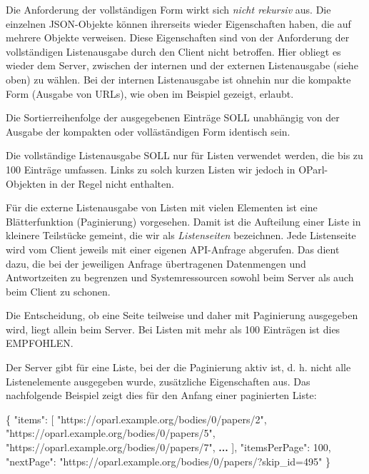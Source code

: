 \documentclass[,a4paper]{article}
\newenvironment{Shaded}{}{}
\newcommand{\DataTypeTok}[1]{\textcolor[rgb]{0.56,0.13,0.00}{{#1}}}
\newcommand{\DecValTok}[1]{\textcolor[rgb]{0.25,0.63,0.44}{{#1}}}
\newcommand{\StringTok}[1]{\textcolor[rgb]{0.25,0.44,0.63}{{#1}}}
\newcommand{\OtherTok}[1]{\textcolor[rgb]{0.00,0.44,0.13}{{#1}}}
\newcommand{\FunctionTok}[1]{\textcolor[rgb]{0.02,0.16,0.49}{{#1}}}
\newcommand{\ErrorTok}[1]{\textcolor[rgb]{1.00,0.00,0.00}{\textbf{{#1}}}}
\begin{document}
Die Anforderung der vollständigen Form wirkt sich \emph{nicht rekursiv}
aus. Die einzelnen JSON-Objekte können ihrerseits wieder Eigenschaften
haben, die auf mehrere Objekte verweisen. Diese Eigenschaften sind von
der Anforderung der vollständigen Listenausgabe durch den Client nicht
betroffen. Hier obliegt es wieder dem Server, zwischen der internen und
der externen Listenausgabe (siehe oben) zu wählen. Bei der internen
Listenausgabe ist ohnehin nur die kompakte Form (Ausgabe von URLs), wie
oben im Beispiel gezeigt, erlaubt.

Die Sortierreihenfolge der ausgegebenen Einträge SOLL unabhängig von der
Ausgabe der kompakten oder volläständigen Form identisch sein.

Die vollständige Listenausgabe SOLL nur für Listen verwendet werden, die
bis zu 100 Einträge umfassen. Links zu solch kurzen Listen wir jedoch in
OParl-Objekten in der Regel nicht enthalten.


Für die externe Listenausgabe von Listen mit vielen Elementen ist eine
Blätterfunktion (Paginierung) vorgesehen. Damit ist die Aufteilung einer
Liste in kleinere Teilstücke gemeint, die wir als \emph{Listenseiten}
bezeichnen. Jede Listenseite wird vom Client jeweils mit einer eigenen
API-Anfrage abgerufen. Das dient dazu, die bei der jeweiligen Anfrage
übertragenen Datenmengen und Antwortzeiten zu begrenzen und
Systemressourcen sowohl beim Server als auch beim Client zu schonen.

Die Entscheidung, ob eine Seite teilweise und daher mit Paginierung
ausgegeben wird, liegt allein beim Server. Bei Listen mit mehr als 100
Einträgen ist dies EMPFOHLEN.

Der Server gibt für eine Liste, bei der die Paginierung aktiv ist, d. h.
nicht alle Listenelemente ausgegeben wurde, zusätzliche Eigenschaften
aus. Das nachfolgende Beispiel zeigt dies für den Anfang einer
paginierten Liste:

\begin{Shaded}
\begin{Highlighting}[]
\FunctionTok{\{}
    \DataTypeTok{"items"}\FunctionTok{:} \OtherTok{[}
        \StringTok{"https://oparl.example.org/bodies/0/papers/2"}\OtherTok{,}
        \StringTok{"https://oparl.example.org/bodies/0/papers/5"}\OtherTok{,}
        \StringTok{"https://oparl.example.org/bodies/0/papers/7"}\OtherTok{,}
        \ErrorTok{...}
    \OtherTok{]}\FunctionTok{,}
    \DataTypeTok{"itemsPerPage"}\FunctionTok{:} \DecValTok{100}\FunctionTok{,}
    \DataTypeTok{"nextPage"}\FunctionTok{:} \StringTok{"https://oparl.example.org/bodies/0/papers/?skip_id=495"}
\FunctionTok{\}}
\end{Highlighting}
\end{Shaded}
\end{document}
